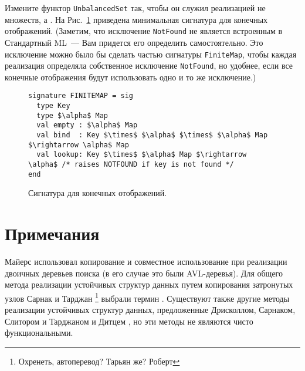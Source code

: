\begin{exercise}\label{ex:2.6}
  Измените функтор \lstinline!UnbalancedSet! так, чтобы он служил
  реализацией не множеств, а . На
  Рис.~\ref{fig:2.10} приведена минимальная сигнатура для конечных
  отображений. (Заметим, что исключение \lstinline!NotFound! не
  является встроенным в Стандартный ML~--- Вам придется его определить
  самостоятельно. Это исключение можно было бы сделать частью
  сигнатуры \lstinline!FiniteMap!,  чтобы каждая реализация
  определяла собственное исключение \lstinline!NotFound!, но удобнее,
  если все конечные отображения будут использовать одно и то же
  исключение.)
\end{exercise}

\begin{figure}
\begin{lstlisting}
signature FINITEMAP = sig
  type Key
  type $\alpha$ Map
  val empty : $\alpha$ Map
  val bind  : Key $\times$ $\alpha$ $\times$ $\alpha$ Map $\rightarrow \alpha$ Map
  val lookup: Key $\times$ $\alpha$ Map $\rightarrow \alpha$ /* raises NOTFOUND if key is not found */
end
\end{lstlisting}
  \caption{Сигнатура для конечных отображений.}
  \label{fig:2.10}
\end{figure}

\section{Примечания}
\label{sc:2.3}

Майерс \cite{Myers1982,Myers1984} использовал копирование и совместное использование
при реализации двоичных деревьев поиска (в его случае это были
AVL-деревья).  Для общего метода реализации устойчивых структур данных
путем копирования затронутых узлов
Сарнак и Тарджан \cite{SarnakTarjan1986a} 
\footnote{Охренеть, автоперевод? Тарьян же? Роберт } 
выбрали термин
. Существуют также другие методы
реализации устойчивых структур данных, предложенные Дрисколлом,
Сарнаком, Слитором и Тарджаном \cite{Driscoll-etal1989} и Дитцем
\cite{Dietz1989}, но эти методы не являются чисто функциональными.

